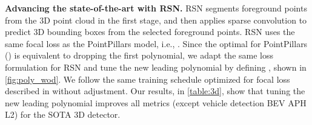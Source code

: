 \vspace{-5pt}
\textbf{Advancing the state-of-the-art with RSN.}
RSN segments foreground points from the 3D point cloud in the first stage, and then applies sparse convolution to predict 3D bounding boxes from the selected foreground points. RSN uses the same focal loss as the PointPillars model, i.e., . Since the optimal  for PointPillars () is equivalent to dropping the first polynomial, we adapt the same loss formulation for RSN and tune the new leading polynomial  by defining , shown in \autoref{fig:poly_wod}. We follow the same training schedule optimized for focal loss described in \citet{rsn} without adjustment. Our results, in \autoref{table:3d}, show that tuning the new leading polynomial improves all metrics (except vehicle detection BEV APH L2) for the SOTA 3D detector.